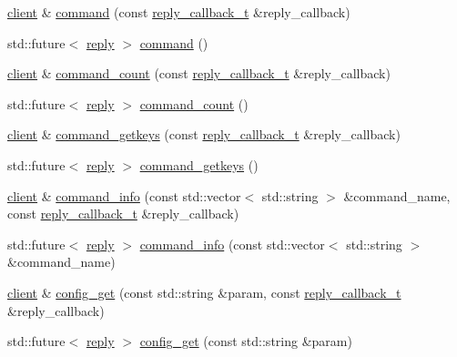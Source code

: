 \begin{DoxyCompactItemize}
\item 
\hyperlink{classcpp__redis_1_1client}{client} \& \hyperlink{classcpp__redis_1_1client_accac4fab4be3f71b94fc0aa02496f6a3}{command} (const \hyperlink{classcpp__redis_1_1client_a061a1140d36d2eaeda82b09a0bb3f9f2}{reply\+\_\+callback\+\_\+t} \&reply\+\_\+callback)
\item 
std\+::future$<$ \hyperlink{classcpp__redis_1_1reply}{reply} $>$ \hyperlink{classcpp__redis_1_1client_a93ef2e84647990d02aa67a1e22341b38}{command} ()
\item 
\hyperlink{classcpp__redis_1_1client}{client} \& \hyperlink{classcpp__redis_1_1client_a639c7fd5c7899ba474e65513ee337bea}{command\+\_\+count} (const \hyperlink{classcpp__redis_1_1client_a061a1140d36d2eaeda82b09a0bb3f9f2}{reply\+\_\+callback\+\_\+t} \&reply\+\_\+callback)
\item 
std\+::future$<$ \hyperlink{classcpp__redis_1_1reply}{reply} $>$ \hyperlink{classcpp__redis_1_1client_af0cac37a62edbd7d699b379551f1ef9a}{command\+\_\+count} ()
\item 
\hyperlink{classcpp__redis_1_1client}{client} \& \hyperlink{classcpp__redis_1_1client_a3d23ff98ee82a404373d75b660720926}{command\+\_\+getkeys} (const \hyperlink{classcpp__redis_1_1client_a061a1140d36d2eaeda82b09a0bb3f9f2}{reply\+\_\+callback\+\_\+t} \&reply\+\_\+callback)
\item 
std\+::future$<$ \hyperlink{classcpp__redis_1_1reply}{reply} $>$ \hyperlink{classcpp__redis_1_1client_a18ab313316e99ab0a690540f40de80e3}{command\+\_\+getkeys} ()
\item 
\hyperlink{classcpp__redis_1_1client}{client} \& \hyperlink{classcpp__redis_1_1client_a95105c556aa5c070819bc82729d336c5}{command\+\_\+info} (const std\+::vector$<$ std\+::string $>$ \&command\+\_\+name, const \hyperlink{classcpp__redis_1_1client_a061a1140d36d2eaeda82b09a0bb3f9f2}{reply\+\_\+callback\+\_\+t} \&reply\+\_\+callback)
\item 
std\+::future$<$ \hyperlink{classcpp__redis_1_1reply}{reply} $>$ \hyperlink{classcpp__redis_1_1client_abd02a4d296ed0c160e935cd176862334}{command\+\_\+info} (const std\+::vector$<$ std\+::string $>$ \&command\+\_\+name)
\item 
\hyperlink{classcpp__redis_1_1client}{client} \& \hyperlink{classcpp__redis_1_1client_a510ede75cc6361f33a4cdd0695f7543f}{config\+\_\+get} (const std\+::string \&param, const \hyperlink{classcpp__redis_1_1client_a061a1140d36d2eaeda82b09a0bb3f9f2}{reply\+\_\+callback\+\_\+t} \&reply\+\_\+callback)
\item 
std\+::future$<$ \hyperlink{classcpp__redis_1_1reply}{reply} $>$ \hyperlink{classcpp__redis_1_1client_a221b1e414a4b1bb4eb2a7afaac0eb39d}{config\+\_\+get} (const std\+::string \&param)

\end{DoxyCompactItemize}
